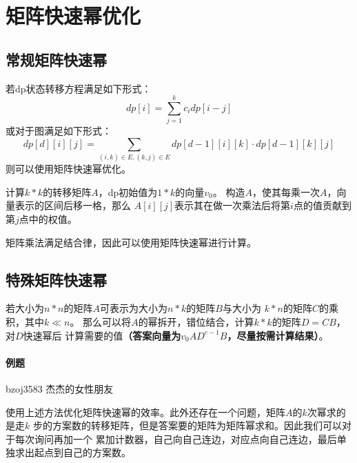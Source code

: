 \section{矩阵快速幂优化}
\subsection{常规矩阵快速幂}
若dp状态转移方程满足如下形式：
\begin{displaymath}
    dp[i]=\sum_{j=1}^k{c_idp[i-j]}
\end{displaymath}
或对于图满足如下形式：
\begin{displaymath}
    dp[d][i][j]=\sum_{(i,k)\in E,(k,j)\in E}{dp[d-1][i][k]\cdot dp[d-1][k][j]}
\end{displaymath}
则可以使用矩阵快速幂优化。

计算$k*k$的转移矩阵$A$，dp初始值为$1*k$的向量$v_0$。
构造$A$，使其每乘一次$A$，向量表示的区间后移一格，那么
$A[i][j]$表示其在做一次乘法后将第$i$点的值贡献到第$j$点中的权值。

矩阵乘法满足结合律，因此可以使用矩阵快速幂进行计算。

\subsection{特殊矩阵快速幂}

若大小为$n*n$的矩阵$A$可表示为大小为$n*k$的矩阵$B$与大小为
$k*n$的矩阵$C$的乘积，其中$k\ll n$。
那么可以将$A$的幂拆开，错位结合，计算$k*k$的矩阵$D=CB$，对$D$快速幂后
计算需要的值{\bfseries （答案向量为$v_0AD^{c-1}B$，尽量按需计算结果）}。

\paragraph{例题} bzoj3583 杰杰的女性朋友

使用上述方法优化矩阵快速幂的效率。此外还存在一个问题，矩阵$A$的$k$次幂求的是走$k$
步的方案数的转移矩阵，但是答案要的矩阵为矩阵幂求和。因此我们可以对于每次询问再加一个
累加计数器，自己向自己连边，对应点向自己连边，最后单独求出起点到自己的方案数。
